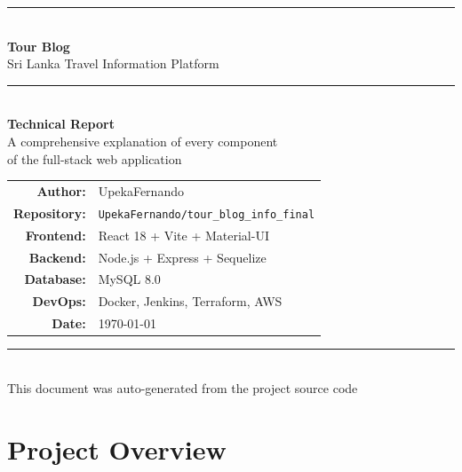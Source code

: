 \documentclass[12pt,a4paper]{report}
\begin{document}
\begin{titlepage}
  \centering
  \vspace*{2cm}
  {\color{primary}\rule{\linewidth}{2pt}}\\[0.5cm]
  {\Huge\bfseries\color{primary} Tour Blog}\\[0.3cm]
  {\Large\color{accent} Sri Lanka Travel Information Platform}\\[0.2cm]
  {\color{primary}\rule{\linewidth}{2pt}}\\[1.5cm]

  {\large\bfseries Technical Report}\\[0.5cm]
  {\normalsize A comprehensive explanation of every component\\
   of the full-stack web application}\\[2cm]

  \begin{tabular}{rl}
    \textbf{Author:}      & UpekaFernando \\[4pt]
    \textbf{Repository:}  & \texttt{UpekaFernando/tour\_blog\_info\_final} \\[4pt]
    \textbf{Frontend:}    & React 18 + Vite + Material-UI \\[4pt]
    \textbf{Backend:}     & Node.js + Express + Sequelize \\[4pt]
    \textbf{Database:}    & MySQL 8.0 \\[4pt]
    \textbf{DevOps:}      & Docker, Jenkins, Terraform, AWS \\[4pt]
    \textbf{Date:}        & \today \\
  \end{tabular}

  \vfill
  {\color{primary}\rule{\linewidth}{1pt}}\\
  {\small This document was auto-generated from the project source code}
\end{titlepage}

\tableofcontents
\newpage

\chapter{Project Overview}
\end{document}
